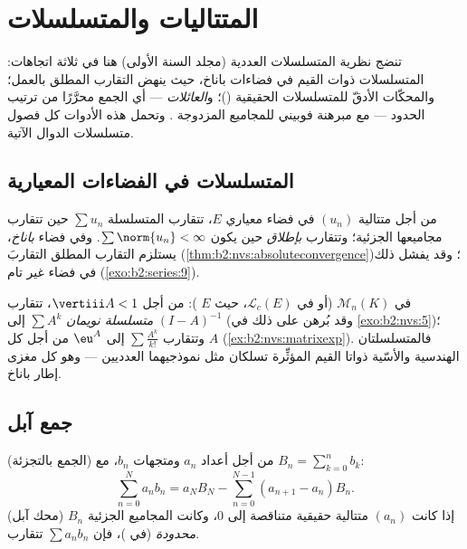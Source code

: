 \chapter{المتتاليات والمتسلسلات}\label{ch:b2:series}

تنضج نظرية المتسلسلات العددية (مجلد السنة الأولى) هنا في ثلاثة
اتجاهات: المتسلسلات ذوات القيم في فضاءات باناخ، حيث ينهض
التقارب المطلق بالعمل؛ والمحكّات الأدقّ للمتسلسلات الحقيقية ()؛ و\emph{العائلات } --- أي الجمع محرَّرًا من
ترتيب الحدود --- مع مبرهنة فوبيني للمجاميع المزدوجة .
وتحمل هذه الأدوات كل فصول متسلسلات الدوال الآتية.

\section{المتسلسلات في الفضاءات المعيارية}

\begin{definition}\label{def:b2:series:def}
من أجل متتالية $(u_n)$ في فضاء معياري $E$، تتقارب المتسلسلة $\sum u_n$
حين تتقارب مجاميعها الجزئية؛ وتتقارب
\emph{بإطلاق} حين يكون
$\sum \norm{u_n} < \infty$. وفي فضاء \emph{باناخ}، يستلزم التقارب
المطلق التقاربَ (\cref{thm:b2:nvs:absoluteconvergence})؛
وقد يفشل ذلك في فضاء غير تام
(\cref{exo:b2:series:9}).
\end{definition}

\begin{example}\label{ex:b2:series:neumann}
في $\mathcal{M}_n(K)$ (أو في $\mathcal{L}_c(E)$، حيث $E$ ): من أجل
$\vertiii A < 1$، تتقارب \emph{متسلسلة نويمان} $\sum A^k$
 إلى $(I - A)^{-1}$ (وقد بُرهن على ذلك في \cref{exo:b2:nvs:5})؛
وتتقارب $\sum \frac{A^k}{k!}$  إلى $\eu^A$ من أجل كل $A$
(\cref{ex:b2:nvs:matrixexp}). فالمتسلسلتان الهندسية والأسّية
ذواتا القيم المؤثِّرة تسلكان مثل نموذجيهما العدديين --- وهو كل
مغزى إطار باناخ.
\end{example}

\section{جمع آبل}

\begin{theorem}\label{thm:b2:series:abel}
(الجمع بالتجزئة) من أجل أعداد $a_n$ ومتجهات $b_n$، مع $B_n
= \sum_{k=0}^{n} b_k$:
\[
\sum_{n=0}^{N} a_n b_n
= a_N B_N - \sum_{n=0}^{N-1} (a_{n+1} - a_n) B_n .
\]
(محك آبل) إذا كانت $(a_n)$ متتالية حقيقية متناقصة إلى $0$، وكانت
المجاميع الجزئية $B_n$ \emph{محدودة} (في )، فإن
$\sum a_n b_n$ تتقارب.
\end{theorem}


